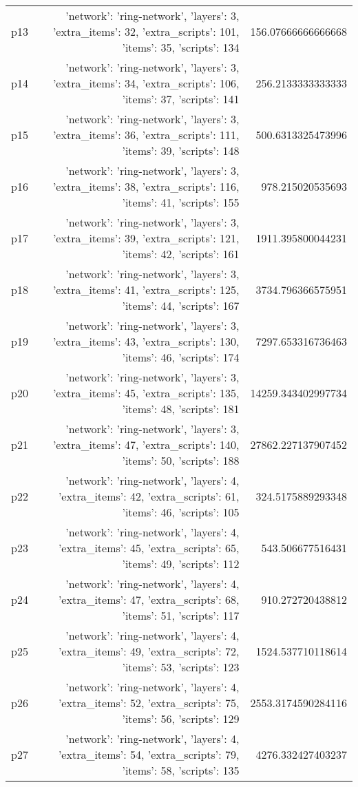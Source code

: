 \documentclass{article}
\begin{document}
\begin{center}
\begin{tabular}{r|r|r}
  p13&{'network': 'ring-network', 'layers': 3, 'extra\_items': 32, 'extra\_scripts': 101, 'items': 35, 'scripts': 134}&156.07666666666668\\
  p14&{'network': 'ring-network', 'layers': 3, 'extra\_items': 34, 'extra\_scripts': 106, 'items': 37, 'scripts': 141}&256.2133333333333\\
  p15&{'network': 'ring-network', 'layers': 3, 'extra\_items': 36, 'extra\_scripts': 111, 'items': 39, 'scripts': 148}&500.6313325473996\\
  p16&{'network': 'ring-network', 'layers': 3, 'extra\_items': 38, 'extra\_scripts': 116, 'items': 41, 'scripts': 155}&978.215020535693\\
  p17&{'network': 'ring-network', 'layers': 3, 'extra\_items': 39, 'extra\_scripts': 121, 'items': 42, 'scripts': 161}&1911.395800044231\\
  p18&{'network': 'ring-network', 'layers': 3, 'extra\_items': 41, 'extra\_scripts': 125, 'items': 44, 'scripts': 167}&3734.796366575951\\
  p19&{'network': 'ring-network', 'layers': 3, 'extra\_items': 43, 'extra\_scripts': 130, 'items': 46, 'scripts': 174}&7297.653316736463\\
  p20&{'network': 'ring-network', 'layers': 3, 'extra\_items': 45, 'extra\_scripts': 135, 'items': 48, 'scripts': 181}&14259.343402997734\\
  p21&{'network': 'ring-network', 'layers': 3, 'extra\_items': 47, 'extra\_scripts': 140, 'items': 50, 'scripts': 188}&27862.227137907452\\
  p22&{'network': 'ring-network', 'layers': 4, 'extra\_items': 42, 'extra\_scripts': 61, 'items': 46, 'scripts': 105}&324.5175889293348\\
  p23&{'network': 'ring-network', 'layers': 4, 'extra\_items': 45, 'extra\_scripts': 65, 'items': 49, 'scripts': 112}&543.506677516431\\
  p24&{'network': 'ring-network', 'layers': 4, 'extra\_items': 47, 'extra\_scripts': 68, 'items': 51, 'scripts': 117}&910.272720438812\\
  p25&{'network': 'ring-network', 'layers': 4, 'extra\_items': 49, 'extra\_scripts': 72, 'items': 53, 'scripts': 123}&1524.537710118614\\
  p26&{'network': 'ring-network', 'layers': 4, 'extra\_items': 52, 'extra\_scripts': 75, 'items': 56, 'scripts': 129}&2553.3174590284116\\
  p27&{'network': 'ring-network', 'layers': 4, 'extra\_items': 54, 'extra\_scripts': 79, 'items': 58, 'scripts': 135}&4276.332427403237\\

\end{tabular}
\end{center}
\end{document}
